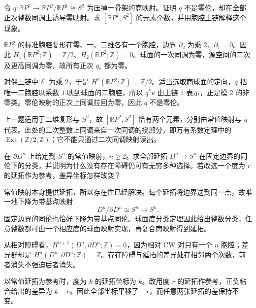 \begin{exercise}\label{g2:ex:projective-plane-sphere-map}
	令 \(q:\mathbb RP^2\to\mathbb RP^2/\mathbb RP^1\cong S^2\) 为压掉一骨架的商映射。证明 \(q\) 不是零伦，却在全部正次整数同调上诱导零映射。求 \([\mathbb RP^2,S^2]\) 的元素个数，并用胞腔上链解释这个现象。
\end{exercise}
\begin{solution}
	\(\mathbb RP^2\) 的标准胞腔复形在零、一、二维各有一个胞腔，边界 \(\partial_2\) 为乘 \(2\)、\(\partial_1=0\)。因此 \(H_1(\mathbb RP^2;\mathbb Z)=\mathbb Z/2\)、\(H_2(\mathbb RP^2;\mathbb Z)=0\)。球面的一次同调为零，源空间的二次及更高同调为零，故所有正次 \(q_*\) 都为零。

	对偶上链中 \(\delta^1\) 为乘 \(2\)，于是 \(H^2(\mathbb RP^2;\mathbb Z)=\mathbb Z/2\)。适当选取商球面的定向，\(q\) 把唯一二胞腔以系数 \(1\) 映到球面的二胞腔，所以 \(q^*u\) 由上链 \(1\) 表示，正是模 \(2\) 的非零类。零伦映射的正次上同调拉回为零，因此 \(q\) 不是零伦。

	上一题适用于二维复形与 \(S^2\)，故 \([\mathbb RP^2,S^2]\) 恰有两个元素，分别由常值映射与 \(q\) 代表。此处的二次整数上同调来自一次同调的挠部分，即万有系数定理中的 \(\operatorname{Ext}(\mathbb Z/2,\mathbb Z)\)；它不能只通过二次同调映射读出。
\end{solution}

\begin{exercise}\label{g2:ex:disk-extension-choices}
	在 \(\partial D^n\) 上给定到 \(S^n\) 的常值映射，\(n\ge2\)。求全部延拓 \(D^n\to S^n\) 在固定边界的同伦下的分类，并说明为什么没有存在障碍仍可有无穷多种选择。若改选一个度为 \(r\) 的延拓作为参考，差异坐标怎样改变？
\end{exercise}
\begin{solution}
	常值映射本身提供延拓，所以存在性已经解决。每个延拓将边界送到同一点，故唯一地下降为带基点映射
	\[
		D^n/\partial D^n\cong S^n\longrightarrow S^n.
	\]
	固定边界的同伦也恰好下降为带基点同伦。球面度分类定理因此给出整数分类，任意整数都可由一个相应度的球面映射实现，再复合商映射得到延拓。

	从相对障碍看，\(H^{n+1}(D^n,\partial D^n;\mathbb Z)=0\)，因为相对 CW 对只有一个 \(n\) 胞腔；差异群却是 \(H^n(D^n,\partial D^n;\mathbb Z)=\mathbb Z\)。存在障碍与延拓的差异处在相邻两个次数，前者消失不强迫后者消失。

	以常值延拓为参考时，度为 \(k\) 的延拓坐标为 \(k\)。改用度 \(r\) 的延拓作参考，正负粘合给出的差异为 \(k-r\)。因此全部坐标平移了 \(-r\)，而任意两张延拓的差保持不变。
\end{solution}

